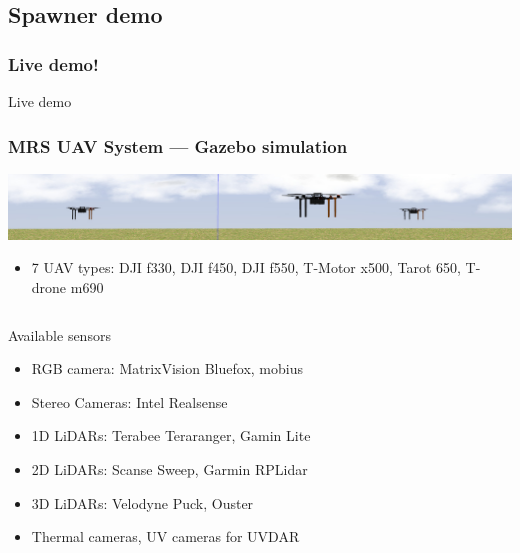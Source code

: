 \documentclass[aspectratio=169]{beamer}
\begin{document}


\subsection{Spawner demo}

\begin{frame}
  \frametitle{Live demo!}

  \begin{center}
    \huge Live demo
  \end{center}

\end{frame}



  \begin{frame}
    \frametitle{MRS UAV System --- Gazebo simulation}

    \vspace{-0.33em}

    \includegraphics[width=1.0\textwidth]{./fig/thumbnail_simulation.jpg}

    \vspace{-0.3em}

    \begin{itemize}
      \item 7 UAV types: DJI f330, DJI f450, DJI f550, T-Motor x500, Tarot 650, T-drone m690
    \end{itemize}

    \begin{columns}[c]


      \begin{block}{Available sensors}
        \begin{itemize}
          \item RGB camera: MatrixVision Bluefox, mobius
          \item Stereo Cameras: Intel Realsense
          \item 1D LiDARs: Terabee Teraranger, Gamin Lite
          \item 2D LiDARs: Scanse Sweep, Garmin RPLidar
          \item 3D LiDARs: Velodyne Puck, Ouster
          \item Thermal cameras, UV cameras for UVDAR
        \end{itemize}
      \end{block}


\end{columns}
\end{frame}
\end{document}
